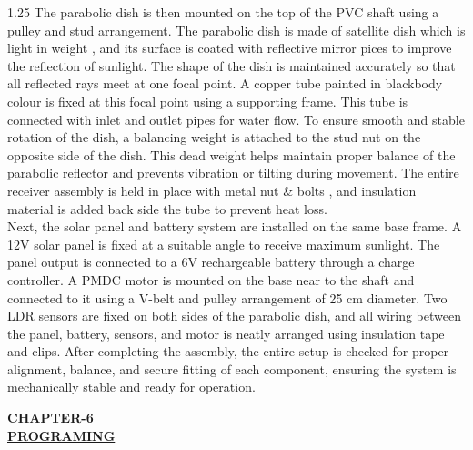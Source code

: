 \documentclass[12pt,a4paper]{article}
\begin{document}

\noindent
\begin{spacing}{1.25}
{\fontsize{10.2}{14.5}\selectfont
The parabolic dish is then mounted on the top of the PVC shaft using a pulley and stud arrangement. The parabolic dish is made of satellite dish which is light in weight , and its surface is coated with reflective mirror pices to improve the reflection of sunlight. The shape of the dish is maintained accurately so that all reflected rays meet at one focal point. A copper tube painted in blackbody colour is fixed at this focal point using a supporting frame. This tube is connected with inlet and outlet pipes for water flow. To ensure smooth and stable rotation of the dish, a balancing weight is attached to the stud nut on the opposite side of the dish. This dead weight helps maintain proper balance of the parabolic reflector and prevents vibration or tilting during movement. The entire receiver assembly is held in place with metal nut \& bolts , and insulation material is added back side the tube to prevent heat loss.\\[4mm]
Next, the solar panel and battery system are installed on the same base frame. A 12V solar panel is fixed at a suitable angle to receive maximum sunlight. The panel output is connected to a 6V rechargeable battery through a charge controller. A PMDC motor is mounted on the base near to the shaft and connected to it using a V-belt and pulley arrangement of 25 cm diameter. Two LDR sensors are fixed on both sides of the parabolic dish, and all wiring between the panel, battery, sensors, and motor is neatly arranged using insulation tape and clips. After completing the assembly, the entire setup is checked for proper alignment, balance, and secure fitting of each component, ensuring the system is mechanically stable and ready for operation.
}
\end{spacing}
\clearpage




\begin{center}
  {\fontsize{15}{18}\selectfont \bfseries \textcolor{red!80!black}{\underline{CHAPTER-6}}}\\[2mm]
  {\fontsize{16}{20}\selectfont \bfseries \textcolor{red!80!black}{\underline{PROGRAMING}}}\\[5mm]
\end{center}
\end{document}
